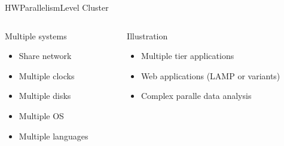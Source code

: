 %
\begin{Frame}{HWParallelismLevel Cluster}
  \begin{columns}[t]
    \begin{column}{5cm} %
      \begin{block}{Multiple systems}
        \begin{itemize}
        \item Share network
        \item Multiple clocks
        \item Multiple disks
        \item Multiple OS
        \item Multiple languages
        \end{itemize}
      \end{block} 
    \end{column}
    
    \begin{column}{5cm} %
      \begin{block}{Illustration}
        \begin{itemize}
        \item Multiple tier applications
        \item Web applications (LAMP or variants)
        \item Complex paralle data analysis
        \end{itemize}
      \end{block}   
    \end{column}
  \end{columns}  
\end{Frame}


